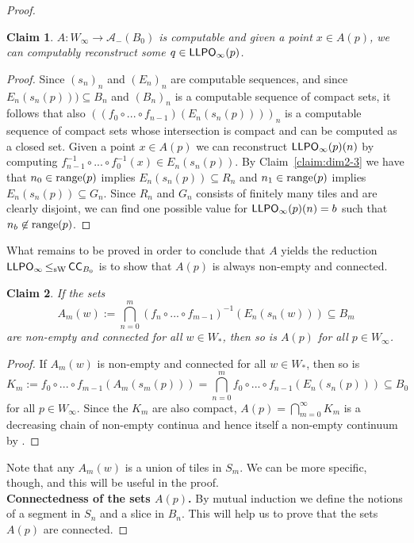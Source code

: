 \documentclass[a4paper]{amsart}
\def\AA{{\mathcal A}}
\def\In{\subseteq}
\def\range{{\rm range}}
\def\LLPO{\text{\rm\sffamily LLPO}}
\def\ConC{\mbox{\rm\sffamily CC}}
\def\LLPO{\mbox{\rm\sffamily LLPO}}
\def\leqSW{\mathop{\leq_{\mathrm{sW}}}}
\newtheorem{localclaim}{Claim}[theorem]
\theoremstyle{definition}
\begin{document}
\begin{proof}
\begin{localclaim}
\label{claim:dim2-5}
$A:W_\infty\to\AA_-(B_0)$ is computable and given a point $x\in A(p)$, we can computably
reconstruct some $q\in\LLPO_\infty(p)$.
\end{localclaim}
\begin{proof}
Since
$(s_n)_n$ and $(E_n)_n$ are computable sequences, and since $E_n(s_n(p)))\In B_n$ and $(B_n)_n$ is a computable
sequence of compact sets, it follows that also $((f_0\circ...\circ f_{n-1})(E_n(s_n(p))))_n$ is a computable sequence
of compact sets whose intersection is compact and can be computed as a closed set.
Given a point $x\in A(p)$ we can reconstruct $\LLPO_\infty(p)(n)$ by computing 
$f_{n-1}^{-1}\circ...\circ f_0^{-1}(x)\in E_n(s_n(p))$. By Claim~\ref{claim:dim2-3} we have that
$n_0\in\range(p)$ implies $E_n(s_n(p))\In R_n$ and $n_1\in\range(p)$ implies $E_n(s_n(p))\In G_n$.
Since $R_n$ and $G_n$ consists of finitely many tiles and are clearly disjoint, we can find one possible
value for $\LLPO_\infty(p)(n)=b$ such that $n_b\not\in\range(p)$.
\end{proof}

What remains to be proved in order to conclude that $A$ yields the reduction $\LLPO_\infty\leqSW\ConC_{B_0}$ is
to show that $A(p)$ is always non-empty and connected.

\begin{localclaim}
\label{claim:dim2-6}
If the sets
\[A_m(w):=\bigcap_{n=0}^m(f_n\circ...\circ f_{m-1})^{-1}(E_n(s_n(w)))\In B_m\]
are non-empty and connected for all $w\in W_*$, then so is $A(p)$ for all $p\in W_\infty$.
\end{localclaim}
\begin{proof}
If $A_m(w)$ is non-empty and connected for all $w\in W_*$, then so is
\[K_m:=f_0\circ...\circ f_{m-1}(A_m(s_m(p)))=\bigcap_{n=0}^m f_0\circ...\circ f_{n-1}(E_n(s_n(p)))\In B_0\]
for all $p\in W_\infty$. Since the $K_m$ are also compact, $A(p)=\bigcap_{m=0}^\infty K_m$
is a decreasing chain of non-empty continua and hence itself a non-empty
continuum by \cite[Corollary~6.1.19]{Eng89}.
\end{proof}

Note that any $A_m(w)$ is a union of tiles in $S_m$. We can be more specific, though, and this will be useful in the proof.\\

\noindent
{\bf Connectedness of the sets $A(p)$.}
By mutual induction we define the notions of a segment in $S_n$ and a slice in $B_n$.
This will help us to prove that the sets $A(p)$ are connected.


\end{proof}
\end{document}
